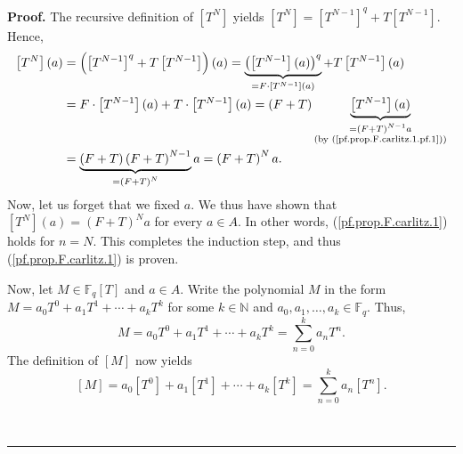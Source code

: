 \documentclass[numbers=enddot,12pt,final,onecolumn,notitlepage]{scrartcl}%
\theoremstyle{definition}
\newenvironment{proof}[1][Proof]{\noindent\textbf{#1.} }{\ \rule{0.5em}{0.5em}}
\let\sumnonlimits\sum
\renewcommand{\sum}{\sumnonlimits\limits}
\begin{document}
\begin{proof}
The recursive definition of $\left[  T^{N}\right]  $ yields $\left[
T^{N}\right]  =\left[  T^{N-1}\right]  ^{q}+T\left[  T^{N-1}\right]  $. Hence,%
\begin{align*}
\left[  T^{N}\right]  \left(  a\right)   &  =\left(  \left[  T^{N-1}\right]
^{q}+T\left[  T^{N-1}\right]  \right)  \left(  a\right)  =\underbrace{\left(
\left[  T^{N-1}\right]  \left(  a\right)  \right)  ^{q}}_{=F\cdot\left[
T^{N-1}\right]  \left(  a\right)  }+T\left[  T^{N-1}\right]  \left(  a\right)
\\
&  =F\cdot\left[  T^{N-1}\right]  \left(  a\right)  +T\cdot\left[
T^{N-1}\right]  \left(  a\right)  =\left(  F+T\right)  \underbrace{\left[
T^{N-1}\right]  \left(  a\right)  }_{\substack{=\left(  F+T\right)
^{N-1}a\\\text{(by (\ref{pf.prop.F.carlitz.1.pf.1}))}}}\\
&  =\underbrace{\left(  F+T\right)  \left(  F+T\right)  ^{N-1}}_{=\left(
F+T\right)  ^{N}}a=\left(  F+T\right)  ^{N}a.
\end{align*}
Now, let us forget that we fixed $a$. We thus have shown that $\left[
T^{N}\right]  \left(  a\right)  =\left(  F+T\right)  ^{N}a$ for every $a\in
A$. In other words, (\ref{pf.prop.F.carlitz.1}) holds for $n=N$. This
completes the induction step, and thus (\ref{pf.prop.F.carlitz.1}) is proven.

Now, let $M\in\mathbb{F}_{q}\left[  T\right]  $ and $a\in A$. Write the
polynomial $M$ in the form $M=a_{0}T^{0}+a_{1}T^{1}+\cdots+a_{k}T^{k}$ for
some $k\in\mathbb{N}$ and $a_{0},a_{1},\ldots,a_{k}\in\mathbb{F}_{q}$. Thus,%
\[
M=a_{0}T^{0}+a_{1}T^{1}+\cdots+a_{k}T^{k}=\sum_{n=0}^{k}a_{n}T^{n}.
\]
The definition of $\left[  M\right]  $ now yields
\[
\left[  M\right]  =a_{0}\left[  T^{0}\right]  +a_{1}\left[  T^{1}\right]
+\cdots+a_{k}\left[  T^{k}\right]  =\sum_{n=0}^{k}a_{n}\left[  T^{n}\right]
.
\]



\end{proof}
\end{document}

